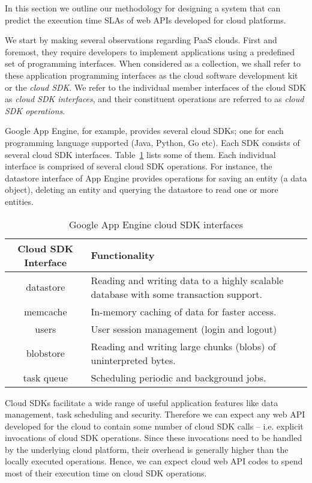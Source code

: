 In this section we outline our methodology for designing a system that can predict the execution
time SLAs of web APIs developed for cloud platforms.

We start by making several observations regarding PaaS clouds. First and foremost, 
they require developers
to implement applications using a predefined set of programming interfaces. When considered as a
collection, we shall refer to these application programming interfaces as the cloud software development 
kit or the \textit{cloud SDK}. We refer to the individual member interfaces of the cloud SDK
as \textit{cloud SDK interfaces}, and their constituent operations are referred to as \textit{cloud SDK operations}.

Google App Engine, for example, provides several cloud SDKs; one for each
programming language supported (Java, Python, Go etc). Each SDK consists of
several cloud SDK interfaces. Table~\ref{tab:gae_cloud_sdk} lists some of them.
Each individual interface is comprised of several cloud SDK operations. For instance, the 
datastore interface of App Engine provides operations for saving an entity (a data object),
deleting an entity and querying the datastore to read one or more entities.

\begin{table}[htdp]
\caption{Google App Engine cloud SDK interfaces}
\begin{center}
\begin{tabular}{|c|p{5cm}|}
\hline
Cloud SDK Interface & Functionality \\ \hline
datastore & Reading and writing data to a highly scalable database with some transaction support. \\ \hline
memcache & In-memory caching of data for faster access.\\ \hline
users & User session management (login and logout)\\ \hline
blobstore & Reading and writing large chunks (blobs) of uninterpreted bytes.\\ \hline
task queue & Scheduling periodic and background jobs.\\ \hline
\end{tabular}
\end{center}
\label{tab:gae_cloud_sdk}
\end{table}

Cloud SDKs facilitate a wide range of useful application features like data management, 
task scheduling and security. Therefore we can expect any web API developed for the cloud to
contain some number of cloud SDK calls -- i.e.
explicit invocations of cloud SDK operations. Since these invocations need to be handled by the
underlying cloud platform, their overhead is generally higher than the locally executed operations.
Hence, we can expect cloud web API codes to spend most of their execution time on cloud SDK operations. 


